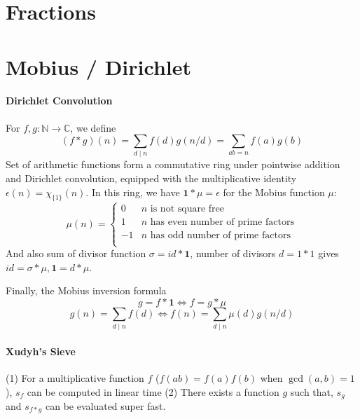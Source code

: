 \section{Fractions}


\section{Mobius / Dirichlet}
\paragraph{Dirichlet Convolution}

For $f, g : \mathbb{N} \to \mathbb{C}$, we define 
$$(f * g)(n) = \sum_{d \mid n} f(d) g(n / d) = \sum_{ab = n} f(a)g(b)$$  
Set of arithmetic functions form a commutative ring under pointwise addition and Dirichlet convolution, equipped with the multiplicative identity $\epsilon(n) = \chi_{\{1\}}(n)$. In this ring, we have $\mathbf{1} * \mu = \epsilon$ for the Mobius function $\mu$:
$$
	\mu(n) = \begin{cases} 0 & n \textrm{ is not square free}\\ 1 & n \textrm{ has even number of prime factors}\\ -1 & n \textrm{ has odd number of prime factors}\\\end{cases}
$$
And also sum of divisor function $\sigma = id * \mathbf{1}$, number of divisors $d = 1 * 1$ gives $id = \sigma * \mu, \mathbf{1} = d * \mu$. 

Finally, the Mobius inversion formula 
$$g = f * \mathbf{1} \iff f = g * \mu$$
$$g(n) = \sum_{d \mid n} f(d) \iff f(n) = \sum_{d \mid n} \mu(d)g(n/d)$$

\paragraph{Xudyh's Sieve}

(1) For a multiplicative function $f$ ($f(ab) = f(a)f(b)$ when $\gcd(a, b) = 1$), $s_f$ can be computed in linear time
(2) There exists a function $g$ such that, $s_g$ and $s_{f * g}$ can be evaluated super fast. 

